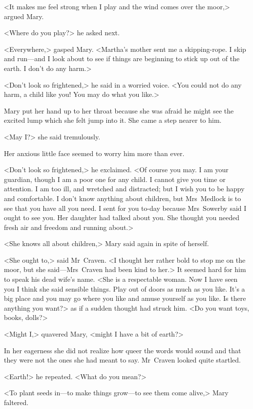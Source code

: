 <It makes me feel strong when I play and the wind comes over the moor,> argued Mary.

<Where do you play?> he asked next.

<Everywhere,> gasped Mary. <Martha's mother sent me a skipping-rope. I skip and run—and I look about to see if things are beginning to stick up out of the earth. I don't do any harm.>

<Don't look so frightened,> he said in a worried voice. <You could not do any harm, a child like you! You may do what you like.>

Mary put her hand up to her throat because she was afraid he might see the excited lump which she felt jump into it. She came a step nearer to him.

<May I\@?> she said tremulously.

Her anxious little face seemed to worry him more than ever.

<Don't look so frightened,> he exclaimed. <Of course you may. I am your guardian, though I am a poor one for any child. I cannot give you time or attention. I am too ill, and wretched and distracted; but I wish you to be happy and comfortable. I don't know anything about children, but Mrs~Medlock is to see that you have all you need. I sent for you to-day because Mrs~Sowerby said I ought to see you. Her daughter had talked about you. She thought you needed fresh air and freedom and running about.>

<She knows all about children,> Mary said again in spite of herself.

<She ought to,> said Mr~Craven. <I thought her rather bold to stop me on the moor, but she said—Mrs~Craven had been kind to her.> It seemed hard for him to speak his dead wife's name. <She is a respectable woman. Now I have seen you I think she said sensible things. Play out of doors as much as you like. It's a big place and you may go where you like and amuse yourself as you like. Is there anything you want?> as if a sudden thought had struck him. <Do you want toys, books, dolls?>

<Might I,> quavered Mary, <might I have a bit of earth?>

In her eagerness she did not realize how queer the words would sound and that they were not the ones she had meant to say. Mr~Craven looked quite startled.

<Earth!> he repeated. <What do you mean?>

<To plant seeds in—to make things grow—to see them come alive,> Mary faltered.

